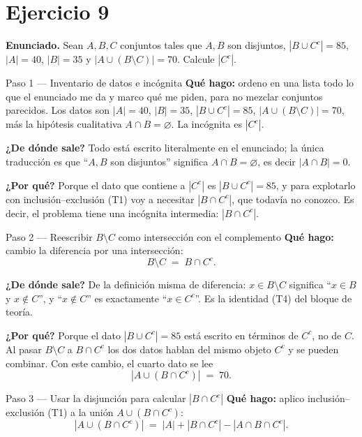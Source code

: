 \documentclass[11pt]{article}
\begin{document}
\section*{Ejercicio 9}

\textbf{Enunciado.} Sean $A, B, C$ conjuntos tales que $A, B$ son disjuntos, $|B\cup C^{c}|=85$, $|A|=40$, $|B|=35$ y $|A\cup (B\setminus C)|=70$. Calcule $|C^{c}|$.

\begin{sol}

\begin{paso}{Paso 1 --- Inventario de datos e incógnita}
\textbf{Qué hago:} ordeno en una lista todo lo que el enunciado me da y marco qué me piden, para no mezclar conjuntos parecidos. Los datos son $|A|=40$, $|B|=35$, $|B\cup C^{c}|=85$, $|A\cup(B\setminus C)|=70$, más la hipótesis cualitativa $A\cap B=\varnothing$. La incógnita es $|C^{c}|$.

\textbf{¿De dónde sale?} Todo está escrito literalmente en el enunciado; la única traducción es que ``$A,B$ son disjuntos'' significa $A\cap B=\varnothing$, es decir $|A\cap B|=0$.

\textbf{¿Por qué?} Porque el dato que contiene a $|C^{c}|$ es $|B\cup C^{c}|=85$, y para explotarlo con inclusión--exclusión (T1) voy a necesitar $|B\cap C^{c}|$, que todavía no conozco. Es decir, el problema tiene una incógnita intermedia: $|B\cap C^{c}|$.
\end{paso}

\begin{paso}{Paso 2 --- Reescribir $B\setminus C$ como intersección con el complemento}
\textbf{Qué hago:} cambio la diferencia por una intersección:
\[
B\setminus C \;=\; B\cap C^{c}.
\]

\textbf{¿De dónde sale?} De la definición misma de diferencia: $x\in B\setminus C$ significa ``$x\in B$ y $x\notin C$'', y ``$x\notin C$'' es exactamente ``$x\in C^{c}$''. Es la identidad (T4) del bloque de teoría.

\textbf{¿Por qué?} Porque el dato $|B\cup C^{c}|=85$ está escrito en términos de $C^{c}$, no de $C$. Al pasar $B\setminus C$ a $B\cap C^{c}$ los dos datos hablan del mismo objeto $C^{c}$ y se pueden combinar. Con este cambio, el cuarto dato se lee
\[
|A\cup (B\cap C^{c})| \;=\; 70.
\]
\end{paso}

\begin{paso}{Paso 3 --- Usar la disjunción para calcular $|B\cap C^{c}|$}
\textbf{Qué hago:} aplico inclusión--exclusión (T1) a la unión $A\cup (B\cap C^{c})$:
\[
|A\cup (B\cap C^{c})| \;=\; |A| + |B\cap C^{c}| - |A\cap B\cap C^{c}|.
\]


\end{paso}
\end{sol}
\end{document}
